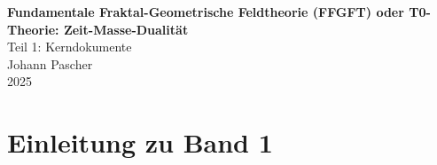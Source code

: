 


	
	\setcounter{section}{0}
	\setcounter{subsection}{0}
	\setcounter{subsubsection}{0}
	\setcounter{paragraph}{0}
	
	\setcounter{secnumdepth}{1}  %
	\makeatletter
	\renewcommand*\l@part[2]{%
		\ifnum \c@tocdepth >-2\relax
		\addpenalty{-\@highpenalty}%
		\addvspace{0.8em \@plus\p@}%
		{\leftskip 0em \relax
			\rightskip \@tocrmarg
			\parfillskip -\rightskip
			\parindent 0em \relax\@afterindenttrue
			\interlinepenalty\@M
			\leavevmode
			{\footnotesize\bfseries #1}\nobreak
			\leaders\hbox{$\m@th\mkern \@dotsep mu\hbox{}\mkern \@dotsep mu$}\hfill
			\nobreak\hb@xt@\@pnumwidth{\hss #2}\par}%
		\addvspace{0.2em \@plus\p@}%
		\nobreak
		\fi}
	\makeatother
	
	\renewcommand{\cftchapfont}{\footnotesize\bfseries}
	\renewcommand{\cftchappagefont}{\footnotesize\bfseries}
	\setlength{\cftbeforechapskip}{0.3em}
	
	\setcounter{tocdepth}{0}
	\begin{titlepage}
		\centering
		\vspace*{2cm}

		

	{\Huge\textbf{Fundamentale Fraktal-Geometrische Feldtheorie (FFGFT) oder T0-Theorie: Zeit-Masse-Dualität}}\\[1cm]
	{\Large Teil 1: Kerndokumente}\\[2cm]		
		{\large Johann Pascher}\\[1cm]
		
		{\large 2025}
		
		\vfill
	\end{titlepage}
	
	\frontmatter
	\pagestyle{fancy}
	\makeatletter
	\let\ps@plain\ps@fancy
	\let\ps@empty\ps@fancy
	\makeatother
	
	\mainmatter
	\pagestyle{fancy}
	
	\tableofcontents


	
	\chapter{Einleitung zu Band 1}
	
	

